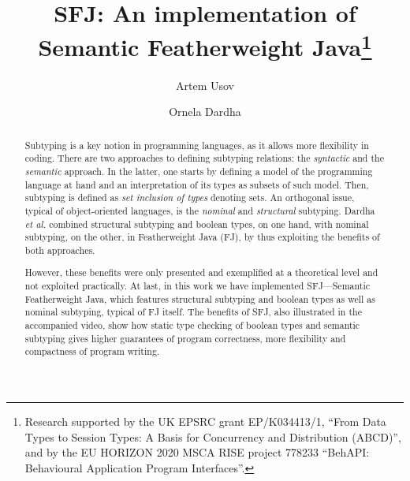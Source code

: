 \documentclass[runningheads]{llncs}
\begin{document}
\title{SFJ: An implementation of Semantic Featherweight Java\thanks{Research supported by the UK EPSRC grant EP/K034413/1, ``From Data Types to Session Types: A Basis for Concurrency and Distribution (ABCD)'', and by the EU HORIZON 2020 MSCA RISE project 778233 ``BehAPI: Behavioural Application Program Interfaces''.}}

\author{Artem Usov \and Ornela Dardha}


\maketitle

\begin{abstract}
Subtyping is a key notion in programming languages, as it allows more flexibility in coding.
There are two approaches to defining subtyping relations: the \emph{syntactic} and the \emph{semantic} approach.
In the latter, one starts by defining a model of the programming language at hand and an interpretation of its types as subsets of such model.
Then, subtyping is defined as \emph{set inclusion of types} denoting sets.
An orthogonal issue, typical of object-oriented languages, is the \emph{nominal} and \emph{structural} subtyping.
Dardha \emph{et al.} \cite{Dardha2013,Dardha2017} combined structural subtyping and boolean types, on one hand, with nominal subtyping, on the other, in Featherweight Java (FJ), by thus exploiting the benefits of both approaches.

However, these benefits were only presented and exemplified at a theoretical level and not exploited practically.
At last, in this work we have implemented SFJ---Semantic Featherweight Java, which features structural subtyping and boolean types as well as nominal subtyping, typical of FJ itself.
The benefits of SFJ, also illustrated in the accompanied video, show how static type checking of boolean types and semantic subtyping gives higher guarantees of program correctness, more flexibility and compactness of program writing.
\end{abstract}
\end{document}

